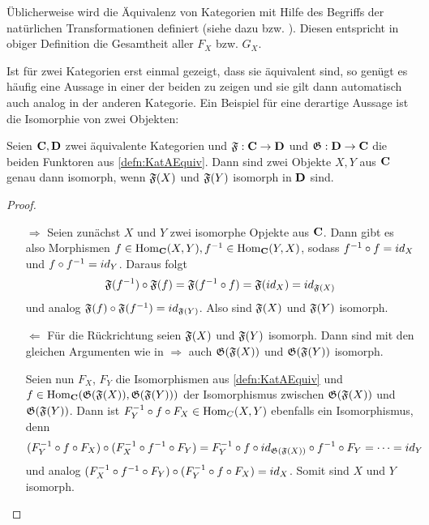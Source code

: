 \begin{bem}
Üblicherweise wird die Äquivalenz von Kategorien mit Hilfe des Begriffs der natürlichen Transformationen definiert (siehe dazu \cite[Kapitel 4]{Pizza2013} bzw. \cite[Defintionen 7 \& 10]{Ambrogio2009}). Diesen entspricht in obiger Definition die Gesamtheit aller $F_X$ bzw. $G_X$.
\end{bem}

Ist für zwei Kategorien erst einmal gezeigt, dass sie äquivalent sind, so genügt es häufig eine Aussage in einer der beiden zu zeigen und sie gilt dann automatisch auch analog in der anderen Kategorie. Ein Beispiel für eine derartige Aussage ist die Isomorphie von zwei Objekten:

\begin{lemma}\label{kor:KatIso2}
Seien $\mathbf{C}, \mathbf{D}$ zwei äquivalente Kategorien und $\mathfrak{F}: \mathbf{C} \to \mathbf{D}$ und $\mathfrak{G}:\mathbf{D} \to \mathbf{C}$ die beiden Funktoren aus \cref{defn:KatAEquiv}. Dann sind zwei Objekte $X, Y$ aus $\mathbf{C}$ genau dann isomorph, wenn $\mathfrak{F}(X)$ und $\mathfrak{F}(Y)$ isomorph in $\mathbf{D}$ sind.
\end{lemma}

\begin{proof}\begin{itemize}
\item[\glqq$\Rightarrow$\grqq]Seien zunächst $X$ und $Y$ zwei isomorphe Opjekte aus $\mathbf{C}$. Dann gibt es also Morphismen  $f \in \mathrm{Hom}_{\mathbf{C}}(X,Y), f^{-1} \in \mathrm{Hom}_{\mathbf{C}}(Y,X)$, sodass $f^{-1} \circ f = id_X$ und $f \circ f^{-1} = id_Y$. Daraus folgt
	\[\mathfrak{F}(f^{-1})\circ \mathfrak{F}(f) = \mathfrak{F}(f^{-1}\circ f) = \mathfrak{F}(id_X) = id_{\mathfrak{F}(X)}\]
und analog $\mathfrak{F}(f)\circ \mathfrak{F}(f^{-1}) = id_{\mathfrak{F}(Y)}$. Also sind $\mathfrak{F}(X)$ und $\mathfrak{F}(Y)$ isomorph.

\item[\glqq$\Leftarrow$\grqq]Für die Rückrichtung seien $\mathfrak{F}(X)$ und $\mathfrak{F}(Y)$ isomorph. Dann sind mit den gleichen Argumenten wie in \glqq$\Rightarrow$\grqq{} auch $\mathfrak{G}(\mathfrak{F}(X))$ und $\mathfrak{G}(\mathfrak{F}(Y))$ isomorph. 

Seien nun $F_X$, $F_Y$ die Isomorphismen aus \cref{defn:KatAEquiv} und $f \in \mathrm{Hom}_{\mathbf{C}}(\mathfrak{G}(\mathfrak{F}(X)),\mathfrak{G}(\mathfrak{F}(Y)))$ der Isomorphismus zwischen $\mathfrak{G}(\mathfrak{F}(X))$ und $\mathfrak{G}(\mathfrak{F}(Y))$. Dann ist $F_Y^{-1} \circ f \circ F_X \in \mathrm{Hom}_C(X,Y)$ ebenfalls ein Isomorphismus, denn
	\[(F_Y^{-1} \circ f \circ F_X) \circ (F_X^{-1} \circ f^{-1} \circ F_Y) = F_Y^{-1} \circ f \circ id_{\mathfrak{G}(\mathfrak{F}(X))} \circ f^{-1} \circ F_Y = \dots = id_Y\]
und analog $(F_X^{-1} \circ f^{-1} \circ F_Y)\circ(F_Y^{-1} \circ f \circ F_X)  = id_X$. Somit sind $X$ und $Y$ isomorph.
\end{itemize}\end{proof}
